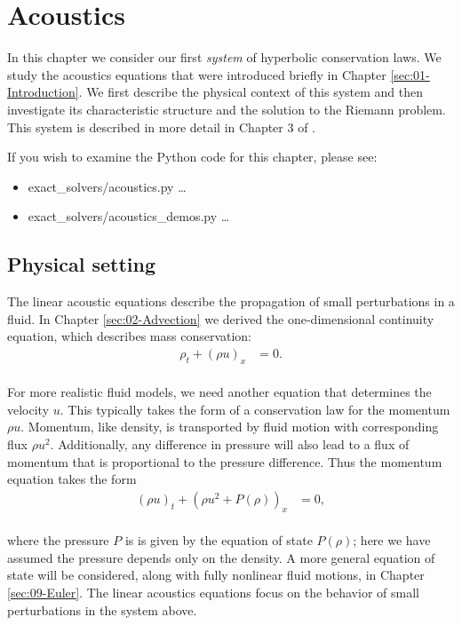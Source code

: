 \documentclass{SIAMbook2016}
\providecommand{\tightlist}{%
      \setlength{\itemsep}{0pt}\setlength{\parskip}{0pt}}
\begin{document}
\hypertarget{acoustics}{%
\chapter{Acoustics}\label{acoustics}}
\label{sec:03-Acoustics}
In this chapter we consider our first \emph{system} of hyperbolic
conservation laws. We study the acoustics equations that were introduced
briefly in Chapter \ref{sec:01-Introduction}. We first describe the
physical context of this system and then investigate its characteristic
structure and the solution to the Riemann problem. This system is
described in more detail in Chapter 3 of \cite{fvmhp}.

If you wish to examine the Python code for this chapter, please see:

\begin{itemize}
\tightlist
\item
  {exact\_solvers/acoustics.py} \ldots{}
\item
  {exact\_solvers/acoustics\_demos.py} \ldots{}
\end{itemize}

\hypertarget{physical-setting}{%
\section{Physical setting}\label{physical-setting}}

The linear acoustic equations describe the propagation of small
perturbations in a fluid. In Chapter \ref{sec:02-Advection} we derived
the one-dimensional continuity equation, which describes mass
conservation:\\
\begin{align} \label{Ac:continuity}
    \rho_t + (\rho u)_x & = 0.
\end{align}\\
For more realistic fluid models, we need another equation that
determines the velocity \(u\). This typically takes the form of a
conservation law for the momentum \(\rho u\). Momentum, like density, is
transported by fluid motion with corresponding flux \(\rho u^2\).
Additionally, any difference in pressure will also lead to a flux of
momentum that is proportional to the pressure difference. Thus the
momentum equation takes the form\\
\begin{align} \label{Ac:mom_cons}
(\rho u)_t + (\rho u^2 + P(\rho))_x & = 0,
\end{align}\\
where the pressure \(P\) is is given by the equation of state
\(P(\rho)\); here we have assumed the pressure depends only on the
density. A more general equation of state will be considered, along with
fully nonlinear fluid motions, in Chapter \ref{sec:09-Euler}. The linear
acoustics equations focus on the behavior of small perturbations in the
system above.
\end{document}
